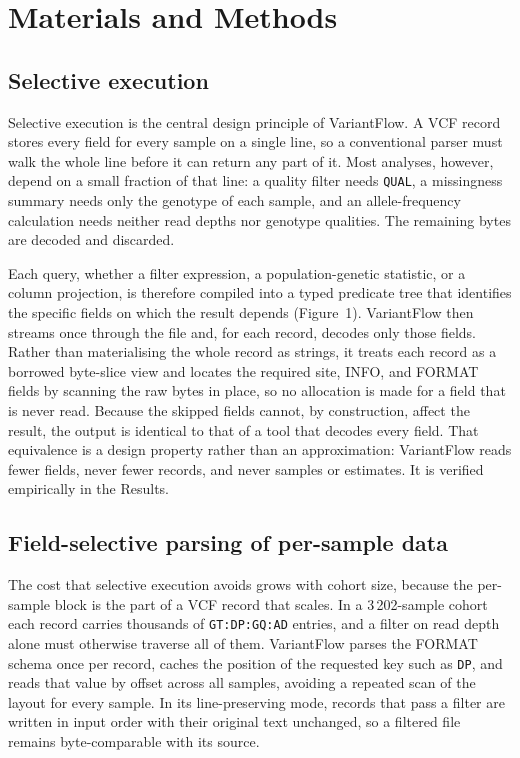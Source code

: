 \section{Materials and Methods}

\subsection{Selective execution}

Selective execution is the central design principle of VariantFlow. A VCF record
stores every field for every sample on a single line, so a conventional parser
must walk the whole line before it can return any part of it. Most analyses,
however, depend on a small fraction of that line: a quality filter needs
\texttt{QUAL}, a missingness summary needs only the genotype of each sample, and
an allele-frequency calculation needs neither read depths nor genotype
qualities. The remaining bytes are decoded and discarded.

Each query, whether a filter expression, a population-genetic statistic, or a
column projection, is therefore compiled into a typed predicate tree that
identifies the specific fields on which the result depends (Figure~1).
VariantFlow then streams once through the file and, for each record, decodes only
those fields. Rather than materialising the whole record as strings, it treats
each record as a borrowed byte-slice view and locates the required site, INFO,
and FORMAT fields by scanning the raw bytes in place, so no allocation is made
for a field that is never read. Because the skipped fields cannot, by
construction, affect the result, the output is identical to that of a tool that
decodes every field. That equivalence is a design property rather than an
approximation: VariantFlow reads fewer fields, never fewer records, and never
samples or estimates. It is verified empirically in the Results.

\subsection{Field-selective parsing of per-sample data}

The cost that selective execution avoids grows with cohort size, because the
per-sample block is the part of a VCF record that scales. In a 3\,202-sample
cohort each record carries thousands of \texttt{GT:DP:GQ:AD} entries, and a
filter on read depth alone must otherwise traverse all of them. VariantFlow
parses the FORMAT schema once per record, caches the position of the requested
key such as \texttt{DP}, and reads that value by offset across all samples,
avoiding a repeated scan of the layout for every sample. In its line-preserving
mode, records that pass a filter are written in input order with their original
text unchanged, so a filtered file remains byte-comparable with its source.

